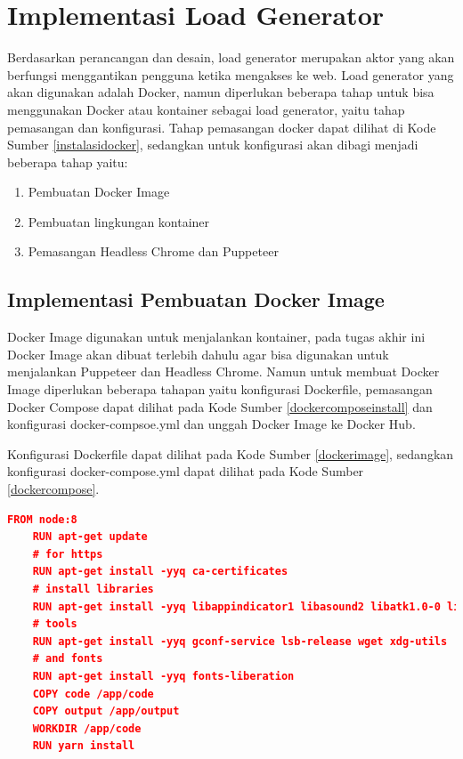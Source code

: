 	\section{Implementasi Load Generator}
		Berdasarkan perancangan dan desain, load generator merupakan aktor yang akan berfungsi menggantikan pengguna ketika mengakses ke web. Load generator yang akan digunakan adalah Docker, namun diperlukan beberapa tahap untuk bisa menggunakan Docker atau kontainer sebagai load generator, yaitu tahap pemasangan dan konfigurasi. Tahap pemasangan docker dapat dilihat di Kode Sumber \ref{instalasidocker}, sedangkan untuk konfigurasi akan dibagi menjadi beberapa tahap yaitu:
		\begin{enumerate}
			\item Pembuatan Docker Image
			\item Pembuatan lingkungan kontainer
			\item Pemasangan Headless Chrome dan Puppeteer
		\end{enumerate}
			
		\subsection{Implementasi Pembuatan Docker Image}
			Docker Image digunakan untuk menjalankan kontainer, pada tugas akhir ini Docker Image akan dibuat terlebih dahulu agar bisa digunakan untuk menjalankan Puppeteer dan Headless Chrome. Namun untuk membuat Docker Image diperlukan beberapa tahapan yaitu konfigurasi Dockerfile, pemasangan Docker Compose dapat dilihat pada Kode Sumber \ref{dockercomposeinstall} dan konfigurasi docker-compsoe.yml dan unggah Docker Image ke Docker Hub.
			
			\indent Konfigurasi Dockerfile dapat dilihat pada Kode Sumber \ref{dockerimage}, sedangkan konfigurasi docker-compose.yml dapat dilihat pada Kode Sumber \ref{dockercompose}.
				\begin{lstlisting}[frame=single,tabsize=2,breaklines,caption={Konfigurasi Dockerfile },label=dockerimage, captionpos=b, language=json]
	FROM node:8
	RUN apt-get update
	# for https
	RUN apt-get install -yyq ca-certificates
	# install libraries
	RUN apt-get install -yyq libappindicator1 libasound2 libatk1.0-0 libc6 libcairo2 libcups2 libdbus-1-3 libexpat1 libfontconfig1 libgcc1 libgconf-2-4 libgdk-pixbuf2.0-0 libglib2.0-0 libgtk-3-0 libnspr4 libnss3 libpango-1.0-0 libpangocairo-1.0-0 libstdc++6 libx11-6 libx11-xcb1 libxcb1 libxcomposite1 libxcursor1 libxdamage1 libxext6 libxfixes3 libxi6 libxrandr2 libxrender1 libxss1 libxtst6
	# tools
	RUN apt-get install -yyq gconf-service lsb-release wget xdg-utils
	# and fonts
	RUN apt-get install -yyq fonts-liberation 
	COPY code /app/code
	COPY output /app/output
	WORKDIR /app/code
	RUN yarn install
				\end{lstlisting}
				
